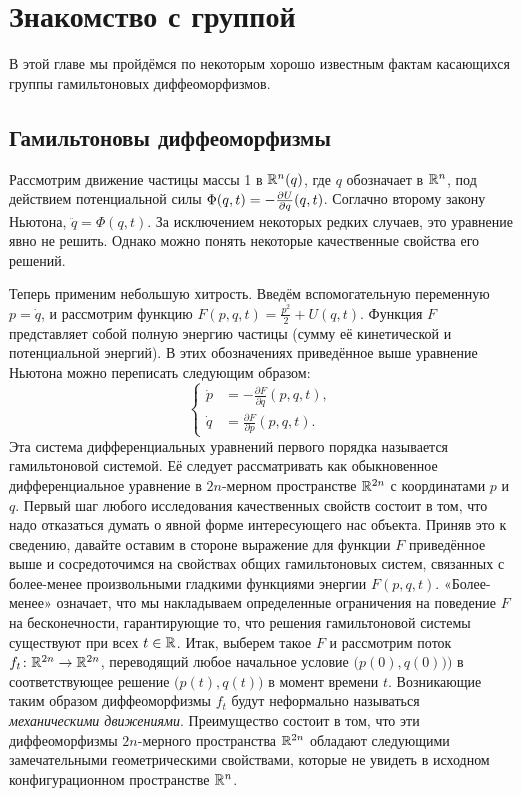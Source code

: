 \chapter{Знакомство с группой}\label{chap:1}

В этой главе мы пройдёмся по некоторым хорошо известным фактам касающихся группы гамильтоновых диффеоморфизмов.

\section[Гамильтоновы диффеоморфизмы]{Гамильтоновы диффеоморфизмы}

Рассмотрим движение частицы массы 1 в $\mathbb{R}^n(q)$, где $q$ обозначает  в $\mathbb{R}^n$, под действием потенциальной силы $\Phi(q, t)  \z= - \tfrac{\partial U}{\partial q} (q, t)$.
Соглачно второму закону Ньютона, $\ddot q= \Phi (q, t)$.
За исключением некоторых редких случаев, это уравнение явно не решить.
Однако можно понять некоторые качественные свойства его решений.

Теперь применим небольшую хитрость.
Введём вспомогательную переменную $p = \dot q$, и рассмотрим функцию $F(p,q,t)= \tfrac {p^2} 2 + U (q, t)$.
Функция $F$ представляет собой полную энергию частицы (сумму её кинетической и потенциальной энергий).
В этих обозначениях приведённое выше уравнение Ньютона можно переписать следующим образом:
\[
\begin{cases}
\dot p &= - \tfrac{\partial F}{\partial q} (p, q, t),\\
\dot q &= \tfrac{\partial F}{\partial p} (p, q, t).
\end{cases}
\]
Эта система дифференциальных уравнений первого порядка называется гамильтоновой системой.
Её следует рассматривать как обыкновенное дифференциальное уравнение в $2n$-мерном пространстве $\mathbb{R}^{2n}$ с координатами $p$ и $q$.
Первый шаг любого исследования качественных свойств состоит в том, что надо отказаться думать о явной форме интересующего нас объекта.
Приняв это к сведению, давайте оставим в стороне выражение для функции
$F$ приведённое выше
и сосредоточимся на свойствах общих гамильтоновых систем, связанных с более-менее произвольными гладкими функциями энергии $F (p, q, t)$.
«Более-менее» означает, что мы накладываем определенные ограничения на поведение $F$ на бесконечности, гарантирующие то, что решения гамильтоновой системы существуют при всех $t\in \mathbb{R}$.
Итак, выберем такое $F$ и рассмотрим поток $f_t\colon \mathbb{R}^{2n} \to \mathbb{R}^{2n}$, переводящий любое начальное условие $\big(p(0),q(0)\big))$ в соответствующее решение $\big(p (t), q (t)\big)$ в момент времени $t$.
Возникающие таким образом диффеоморфизмы $f_t$ будут неформально называться \emph{механическими движениями}.
Преимущество  состоит в том, что эти диффеоморфизмы $2n$-мерного пространства $\mathbb{R}^{2n}$ обладают следующими замечательными геометрическими свойствами, которые не увидеть в исходном конфигурационном пространстве $\mathbb{R}^n$.

